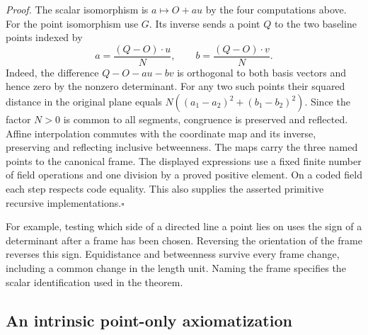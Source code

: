 \emph{Proof.}
The scalar isomorphism is $a\mapsto O+a u$ by the four computations
above. For the point isomorphism use $G$. Its inverse sends a point
$Q$ to the two baseline points indexed by
\[
 a=\frac{(Q-O)\cdot u}{N},\qquad
 b=\frac{(Q-O)\cdot v}{N}.
\]
Indeed, the difference $Q-O-au-bv$ is orthogonal to both basis vectors
and hence zero by the nonzero determinant. For any two such points their
squared distance in the original plane equals
$N((a_1-a_2)^2+(b_1-b_2)^2)$. Since the factor $N>0$ is common to all
segments, congruence is preserved and reflected. Affine interpolation
commutes with the coordinate map and its inverse, preserving and
reflecting inclusive betweenness. The maps carry the three named points
to the canonical frame. The displayed expressions use a fixed finite
number of field operations and one division by a proved positive
element. On a coded field each step respects code equality. This also
supplies the asserted primitive recursive implementations.\hfill$\square$

For example, testing which side of a directed line a point lies on
uses the sign of a determinant after a frame has been chosen. Reversing
the orientation of the frame reverses this sign. Equidistance and
betweenness survive every frame change, including a common change in the
length unit. Naming the frame specifies the scalar identification used
in the theorem.

\subsection{An intrinsic point-only axiomatization}

